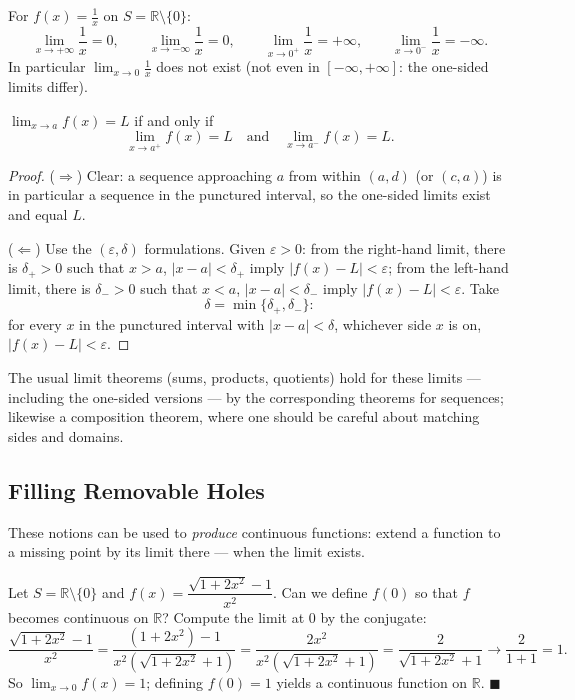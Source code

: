 \documentclass[11pt]{report}
\begin{document}
\begin{exbox}
For $f(x) = \tfrac1x$ on $S = \mathbb{R}\setminus\{0\}$:
\[
\lim_{x\to+\infty} \frac1x = 0, \qquad \lim_{x\to-\infty} \frac1x = 0, \qquad \lim_{x\to 0^+} \frac1x = +\infty, \qquad \lim_{x\to 0^-} \frac1x = -\infty.
\]
In particular $\lim_{x\to 0} \tfrac1x$ does not exist (not even in $[-\infty,+\infty]$: the one-sided limits differ).
\end{exbox}

\begin{thmbox}
$\displaystyle\lim_{x\to a} f(x) = L$ if and only if
\[
\lim_{x\to a^+} f(x) = L \quad \text{and} \quad \lim_{x\to a^-} f(x) = L.
\]
\end{thmbox}

\begin{proof}
($\Rightarrow$) Clear: a sequence approaching $a$ from within $(a,d)$ (or $(c,a)$) is in particular a sequence in the punctured interval, so the one-sided limits exist and equal $L$.

($\Leftarrow$) Use the $(\varepsilon,\delta)$ formulations. Given $\varepsilon > 0$: from the right-hand limit, there is $\delta_+ > 0$ such that $x > a$, $|x - a| < \delta_+$ imply $|f(x) - L| < \varepsilon$; from the left-hand limit, there is $\delta_- > 0$ such that $x < a$, $|x-a| < \delta_-$ imply $|f(x) - L| < \varepsilon$. Take
\[
\delta = \min\{\delta_+, \delta_-\}:
\]
for every $x$ in the punctured interval with $|x - a| < \delta$, whichever side $x$ is on, $|f(x) - L| < \varepsilon$.
\end{proof}

\begin{rembox}
The usual limit theorems (sums, products, quotients) hold for these limits --- including the one-sided versions --- by the corresponding theorems for sequences; likewise a composition theorem, where one should be careful about matching sides and domains.
\end{rembox}

\subsection{Filling Removable Holes}

These notions can be used to \emph{produce} continuous functions: extend a function to a missing point by its limit there --- when the limit exists.

\begin{exbox}
Let $S = \mathbb{R}\setminus\{0\}$ and $f(x) = \dfrac{\sqrt{1+2x^2} - 1}{x^2}$. Can we define $f(0)$ so that $f$ becomes continuous on $\mathbb{R}$? Compute the limit at $0$ by the conjugate:
\[
\frac{\sqrt{1+2x^2}-1}{x^2}
= \frac{(1 + 2x^2) - 1}{x^2\left(\sqrt{1+2x^2}+1\right)}
= \frac{2x^2}{x^2\left(\sqrt{1+2x^2}+1\right)}
= \frac{2}{\sqrt{1+2x^2}+1} \longrightarrow \frac{2}{1+1} = 1.
\]
So $\lim_{x\to0} f(x) = 1$; defining $f(0) = 1$ yields a continuous function on $\mathbb{R}$. \hfill $\blacksquare$
\end{exbox}
\end{document}
